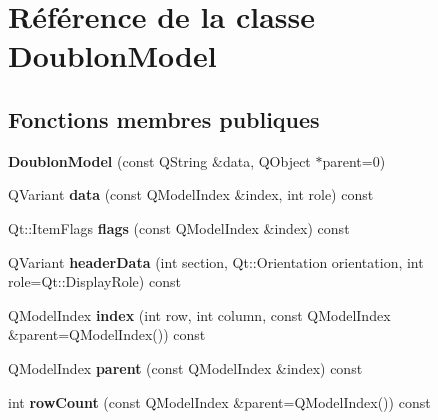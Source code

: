 \hypertarget{class_doublon_model}{\section{Référence de la classe Doublon\-Model}
\label{class_doublon_model}
}
\subsection*{Fonctions membres publiques}
\begin{DoxyCompactItemize}
\item 
\hypertarget{class_doublon_model_a33c5fb7b1b039ca333453024f461afdd}{{\bfseries Doublon\-Model} (const Q\-String \&data, Q\-Object $\ast$parent=0)}\label{class_doublon_model_a33c5fb7b1b039ca333453024f461afdd}

\item 
\hypertarget{class_doublon_model_a10e14770aec49a113eb478af1c869bbb}{Q\-Variant {\bfseries data} (const Q\-Model\-Index \&index, int role) const }\label{class_doublon_model_a10e14770aec49a113eb478af1c869bbb}

\item 
\hypertarget{class_doublon_model_aff5724d094400fd653e4d35ab4a2bfea}{Qt\-::\-Item\-Flags {\bfseries flags} (const Q\-Model\-Index \&index) const }\label{class_doublon_model_aff5724d094400fd653e4d35ab4a2bfea}

\item 
\hypertarget{class_doublon_model_aafaab9974fb6f13dfed5b352051a9c8b}{Q\-Variant {\bfseries header\-Data} (int section, Qt\-::\-Orientation orientation, int role=Qt\-::\-Display\-Role) const }\label{class_doublon_model_aafaab9974fb6f13dfed5b352051a9c8b}

\item 
\hypertarget{class_doublon_model_a43711f335c10c2d82cba2ba935d5d903}{Q\-Model\-Index {\bfseries index} (int row, int column, const Q\-Model\-Index \&parent=Q\-Model\-Index()) const }\label{class_doublon_model_a43711f335c10c2d82cba2ba935d5d903}

\item 
\hypertarget{class_doublon_model_a4b63ebbfb27fe9bbe52647f175d72d39}{Q\-Model\-Index {\bfseries parent} (const Q\-Model\-Index \&index) const }\label{class_doublon_model_a4b63ebbfb27fe9bbe52647f175d72d39}

\item 
\hypertarget{class_doublon_model_a387f51df68f693ea20af3ab968ca4df6}{int {\bfseries row\-Count} (const Q\-Model\-Index \&parent=Q\-Model\-Index()) const }\label{class_doublon_model_a387f51df68f693ea20af3ab968ca4df6}


\end{DoxyCompactItemize}
